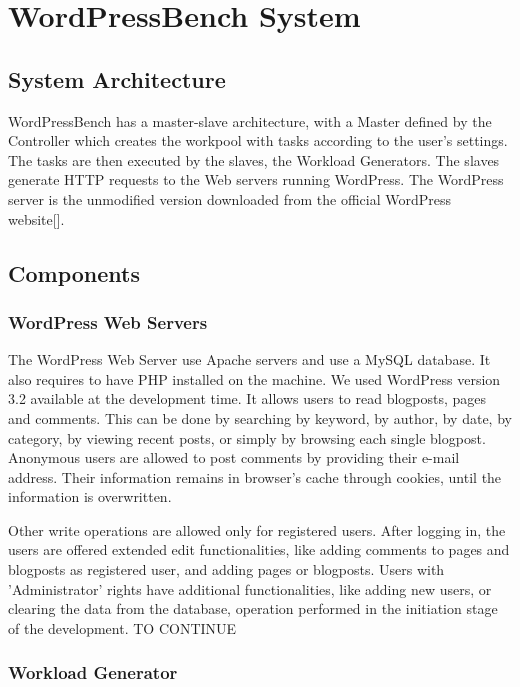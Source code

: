 \chapter{WordPressBench System}
\label{chapter:chapter4}


\section{System Architecture}
\label{sub-sec:system-architecture}

WordPressBench has a master-slave architecture, with a Master defined by the Controller which creates the workpool with tasks according to the user's settings. The tasks are then executed by the slaves, the Workload Generators. The slaves generate HTTP requests to the Web servers running WordPress. The WordPress server is the unmodified version downloaded from the official WordPress website[].

\section{Components}
\label{sec:components}

\subsection{WordPress Web Servers}
\label{sub-sec:wordpress-web-servers}

The WordPress Web Server use Apache servers and use a MySQL database. It also requires to have PHP installed on the machine. We used WordPress version 3.2 available at the development time. It allows users to read blogposts, pages and comments. This can be done by searching by keyword, by author, by date, by category, by viewing recent posts, or simply by browsing each single blogpost. Anonymous users are allowed to post comments by providing their e-mail address. Their information remains in browser's cache through cookies, until the information is overwritten.

Other write operations are allowed only for registered users. After logging in, the users are offered extended edit functionalities, like adding comments to pages and blogposts as registered user, and adding pages or blogposts. Users with 'Administrator' rights have additional functionalities, like adding new users, or clearing the data from the database, operation performed in the initiation stage of the development. TO CONTINUE

\subsection{Workload Generator}
\label{sub-sec:workload-generator}

